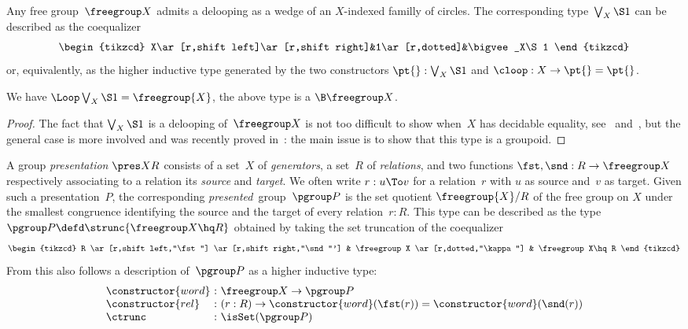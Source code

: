 Any free group~$\freegroup X$ admits a delooping as a wedge of an $X$-indexed familly of circles. The corresponding type~$\bigvee_X\S1$ can be described as the coequalizer
\begin{equation}
  \label{wedge-of-circles}
  \begin{tikzcd}
    X\ar[r,shift left]\ar[r,shift right]&1\ar[r,dotted]&\bigvee_X\S1
  \end{tikzcd}
\end{equation}
or, equivalently, as the higher inductive type
generated by the two constructors $\pt{}:\bigvee_X\S1$ and $\cloop:X\to\pt{}=\pt{}$.

\begin{proposition}
  \label{bouquet-loop-space}
  We have $\Loop\bigvee_X\S1=\freegroup{X}$, \ie the above type is a $\B\freegroup X$.
\end{proposition}
\begin{proof}
  The fact that $\bigvee_X\S1$ is a delooping of~$\freegroup X$ is not too difficult to show when~$X$
  has decidable equality, see~\cite[Exercise 8.2]{hottbook}
  and~\cite{kraus2018free}, but the general case is more involved and was recently proved
  in~\cite{warn2023path}: the main issue is to show that this type is a groupoid.
\end{proof}

A group \emph{presentation} $\pres XR$ consists of a set~$X$ of
\emph{generators}, a set~$R$ of \emph{relations}, and two functions
$\fst,\snd:R\to\freegroup X$ respectively associating to a relation its
\emph{source} and \emph{target}. We often write $r:u\To v$ for a
relation~$r$ with $u$ as source and~$v$ as target.
%
Given such a presentation~$P$, the corresponding \emph{presented} group~$\pgroup P$ is the set quotient $\freegroup{X}/R$ of the free group on $X$ under the
smallest congruence identifying the source and the target of every
relation~$r:R$. This type can be described as the type
$\pgroup P\defd\strunc{{\freegroup X}\hq R}$ obtained by taking the set
truncation of the coequalizer
\[
  \begin{tikzcd}
    R
    \ar[r,shift left,"\fst"]
    \ar[r,shift right,"\snd"']
    &
    \freegroup X
    \ar[r,dotted,"\kappa"]
    &
    \freegroup X\hq R
  \end{tikzcd}
\]
From this also follows a description of~$\pgroup P$ as a higher inductive type:
\[
  \begin{array}{l@{\ :\ }l}
    \constructor{word}&\freegroup X\to\pgroup P\\
    \constructor{rel}&(r:R)\to\constructor{word}(\fst(r))=\constructor{word}(\snd(r))\\
    \ctrunc&\isSet(\pgroup P)
  \end{array}
\]

